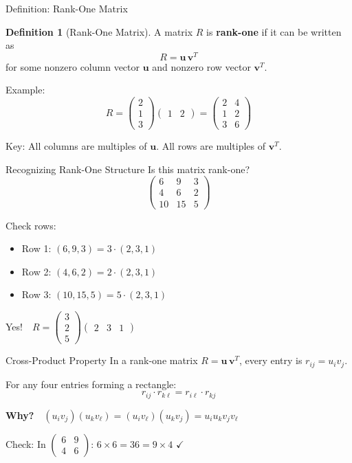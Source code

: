 \documentclass[10pt]{beamer}
\theoremstyle{definition}
\newtheorem{defi}{Definition}[section]
\newcommand{\x}[1]{\alert{\textbf{#1}}}
\begin{document}
\begin{frame}{Definition: Rank-One Matrix}
\begin{defi}[Rank-One Matrix]
A matrix $R$ is \x{rank-one} if it can be written as
$$R = \mathbf{u}\, \mathbf{v}^T$$
for some nonzero column vector $\mathbf{u}$ and nonzero row vector $\mathbf{v}^T$.
\end{defi}

\vspace{0.3cm}
Example:
$$R = \begin{pmatrix} 2 \\ 1 \\ 3 \end{pmatrix} \begin{pmatrix} 1 & 2 \end{pmatrix}
= \begin{pmatrix}
2 & 4 \\
1 & 2 \\
3 & 6
\end{pmatrix}$$

\vspace{0.2cm}
Key: All columns are multiples of $\mathbf{u}$. All rows are multiples of $\mathbf{v}^T$.
\end{frame}

\begin{frame}{Recognizing Rank-One Structure}
Is this matrix rank-one?
$$\begin{pmatrix}
6 & 9 & 3 \\
4 & 6 & 2 \\
10 & 15 & 5
\end{pmatrix}$$

\vfill
Check rows:
\begin{itemize}
\item Row 1: $(6, 9, 3) = 3 \cdot (2, 3, 1)$
\item Row 2: $(4, 6, 2) = 2 \cdot (2, 3, 1)$
\item Row 3: $(10, 15, 5) = 5 \cdot (2, 3, 1)$
\end{itemize}

\vfill
Yes!\ \ $R = \begin{pmatrix} 3 \\ 2 \\ 5 \end{pmatrix} \begin{pmatrix} 2 & 3 & 1 \end{pmatrix}$
\end{frame}

\begin{frame}{Cross-Product Property}
In a rank-one matrix $R = \mathbf{u}\,\mathbf{v}^T$, every entry is $r_{ij} = u_i v_j$.

\vfill
For any four entries forming a rectangle:
$$\boxed{r_{ij} \cdot r_{k\ell} = r_{i\ell} \cdot r_{kj}}$$

\vfill
\textbf{Why?}\ \ $(u_i v_j)(u_k v_\ell) = (u_i v_\ell)(u_k v_j) = u_i u_k v_j v_\ell$

\vfill
Check: In $\begin{pmatrix} 6 & 9 \\ 4 & 6 \end{pmatrix}$: \quad $6 \times 6 = 36 = 9 \times 4$ \quad $\checkmark$
\end{frame}
\end{document}
